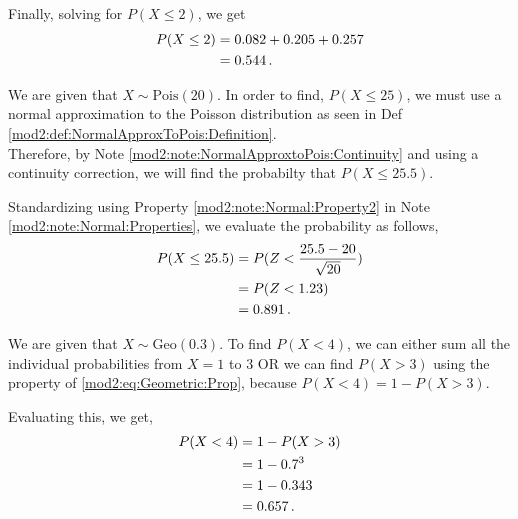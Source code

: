 \begin{subquestions}
Finally, solving for $P(X \leq 2)$, we get 
\begin{align}
		P(X \leq 2) & = 0.082 + 0.205 + 0.257 \nonumber \\
		& = 0.544 \,.
\end{align}

\subquestion

We are given that $X \sim \text{Pois} (20)$. In order to find, $P(X\leq 25)$, we must use a normal approximation to the Poisson distribution as seen in Def \ref{mod2:def:NormalApproxToPois:Definition}.\\

Therefore, by Note \ref{mod2:note:NormalApproxtoPois:Continuity} and using a continuity correction, we will find the probabilty that $P(X \leq 25.5)$.

Standardizing using Property \ref{mod2:note:Normal:Property2} in Note \ref{mod2:note:Normal:Properties}, we evaluate the probability as follows,
\begin{align}
	P(X \leq 25.5) &= P(Z< \frac{25.5-20}{\sqrt{20}}) \nonumber \\
	&=P(Z<1.23) \nonumber \\ 
	&=0.891 \,.
\end{align}

\subquestion

We are given that $X \sim \text{Geo} (0.3)$. To find $P(X<4)$, we can either sum all the individual probabilities from $X=1$ to $3$ OR we can find $P(X>3)$ using the property of \ref{mod2:eq:Geometric:Prop}, because $P(X<4)=1-P(X>3)$.

Evaluating this, we get,
\begin{align}
	P(X<4) &= 1-P(X>3) \nonumber \\
	&=1-0.7^3 \nonumber \\
	&=1-0.343 \nonumber \\
	&=0.657 \,.
\end{align}

\end{subquestions}
